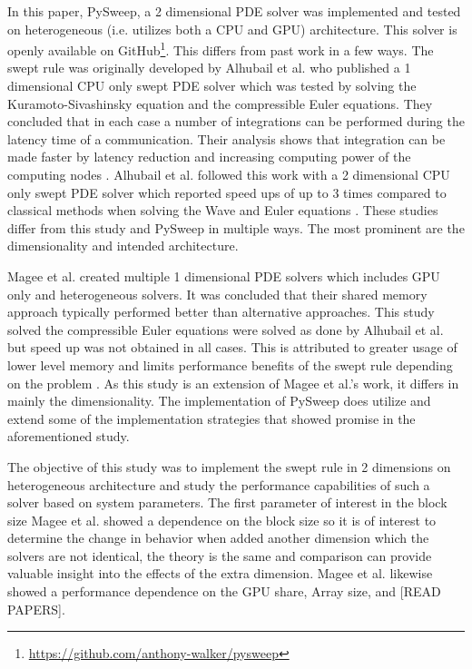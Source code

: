 \documentclass[review]{elsarticle}
\def\github{https://github.com/walkanth/pysweep}
\def\github{\url{https://github.com/anthony-walker/pysweep}}
\begin{document}
\par
In this paper, PySweep, a 2 dimensional PDE solver was implemented and tested on heterogeneous (i.e. utilizes both a CPU and GPU) architecture. This solver is openly available on GitHub\footnote{\github}. This differs from past work in a few ways. The swept rule was originally developed by Alhubail et al. who published a 1 dimensional CPU only swept PDE solver which was tested by solving the Kuramoto-Sivashinsky equation and the compressible Euler equations. They concluded that in each case a number of integrations can be performed during the latency time of a communication. Their analysis shows that integration can be made faster by latency reduction and increasing computing power of the computing nodes \cite{Alhubail2016ThePDEs}. Alhubail et al. followed this work with a 2 dimensional CPU only swept PDE solver which reported speed ups of up to 3 times compared to classical methods when solving the Wave and Euler equations \cite{Alhubail2018ThePDEs}. These studies differ from this study and PySweep in multiple ways. The most prominent are the dimensionality and intended architecture.
\par
Magee et al. created multiple 1 dimensional PDE solvers which includes GPU only and heterogeneous solvers. It was concluded that their shared memory approach typically performed better than alternative approaches. This study solved the compressible Euler equations were solved as done by Alhubail et al. \cite{Alhubail2016ThePDEs} but speed up was not obtained in all cases. This is attributed to greater usage of lower level memory and limits performance benefits of the swept rule depending on the problem \cite{Magee2018AcceleratingDecomposition}. As this study is an extension of Magee et al.'s work, it differs in mainly the dimensionality. The implementation of PySweep does utilize and extend some of the implementation strategies that showed promise in the aforementioned study.

\par
The objective of this study was to implement the swept rule in 2 dimensions on heterogeneous architecture and study the performance capabilities of such a solver based on system parameters. The first parameter of interest in the block size Magee et al. showed a dependence on the block size so it is of interest to determine the change in behavior when added another dimension which the solvers are not identical, the theory is the same and comparison can provide valuable insight into the effects of the extra dimension. Magee et al. likewise showed a performance dependence on the GPU share, Array size, and [READ PAPERS].
\end{document}
